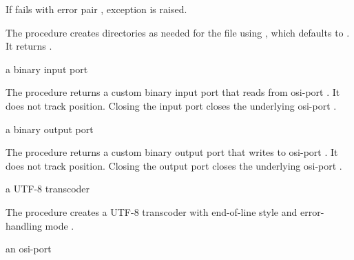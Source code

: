 If  fails with error pair , exception  is raised.

\begin{procedure}
\end{procedure}
\returns{} 

The  procedure creates directories as needed
for the file  using , which defaults to
. It returns .

\begin{procedure}
\end{procedure}
\returns{} a binary input port

The  procedure returns a custom binary input
port that reads from osi-port . It does not track
position. Closing the input port closes the underlying osi-port
.

\begin{procedure}
\end{procedure}
\returns{} a binary output port

The  procedure returns a custom binary
output port that writes to osi-port . It does not track
position. Closing the output port closes the underlying osi-port
.

\begin{procedure}
\end{procedure}
\returns{} a UTF-8 transcoder

The  procedure creates a UTF-8 transcoder
with end-of-line style  and error-handling mode
.

\begin{procedure}
\end{procedure}
\returns{} an osi-port

